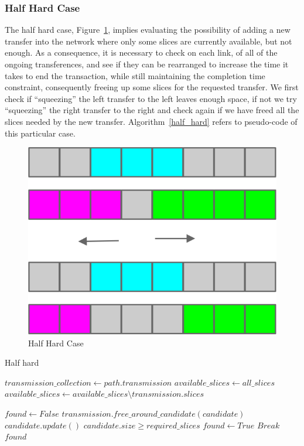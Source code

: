 \documentclass[11pt,a4paper]{article}
\begin{document}
\subsubsection{Half Hard Case}

The half hard case, Figure~\ref{fig:halfhardcase}, implies evaluating the possibility of adding a new transfer into the network where only some slices are currently available, but not enough. As a consequence, it is necessary to check on each link, of all of the ongoing transferences, and see if they can be rearranged to increase the time it takes to end the transaction, while still maintaining the completion time constraint, consequently freeing up some slices for the requested transfer. We first check if ``squeezing'' the left transfer to the left leaves enough space, if not we try ``squeezing'' the right transfer to the right and check again if we have freed all the slices needed by the new transfer. Algorithm~\ref{half_hard} refers to pseudo-code of this particular case.\\

\begin{figure}[H]
  \centering
    \includegraphics[scale=1]{halfhardcase.jpg}
  \caption{Half Hard Case}
  \label{fig:halfhardcase}
\end{figure}

\begin{algorithm}[H]
\caption{Half hard}\label{half_hard}
\begin{algorithmic}[1]
	\State $transmission\_collection\gets path.transmission$
	\State $available\_slices\gets all\_slices$
      \State $available\_slices \gets available\_slices\setminus transmission.slices$
	\EndFor
	
	\State $found \gets False$
			\State $transmission.free\_around\_candidate(candidate)$
		\EndFor
		\State $candidate.update()$
		\If $candidate.size \geq required\_slices$
			\State $found \gets True$
			\State $Break$
		\EndIf
	\EndFor
	\State \Return $found$
\EndProcedure
\end{algorithmic}
\end{algorithm}
\end{document}
